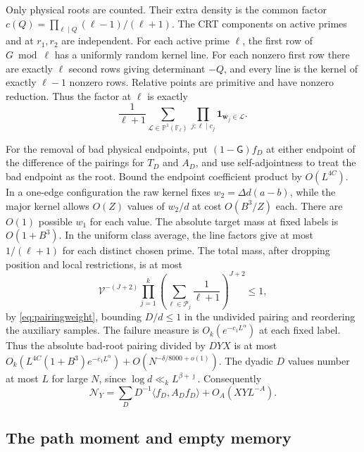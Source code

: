\documentclass[11pt]{amsart}
\numberwithin{equation}{section}
\theoremstyle{remark}
\begin{document}
Only physical roots are counted. Their extra density is the common
factor $c(Q)=\prod_{\ell\mid Q}(\ell-1)/(\ell+1)$. The CRT components
on active primes and at $r_1,r_2$ are independent. For each active
prime $\ell$, the first row of $G\bmod\ell$ has a uniformly random
kernel line. For each nonzero first row there are exactly $\ell$
second rows giving determinant $-Q$, and every line is the kernel of
exactly $\ell-1$ nonzero rows. Relative points are primitive and
have nonzero reduction. Thus the factor at $\ell$ is exactly
\begin{equation}\label{eq:linefactor}
 \frac1{\ell+1}\sum_{\mathcal L\in\mathbb P^1(\mathbb F_\ell)}
   \prod_{j:\ell\mid c_j}\mathbf1_{\overline{\mathbf w_j}\in\mathcal L}.
\end{equation}

For the removal of bad physical endpoints, put $(1-\mathsf G)f_D$
at either endpoint of the difference of the pairings for $T_D$ and
$A_D$, and use self-adjointness to treat the bad endpoint as the
root. Bound the endpoint coefficient product by $O(L^{4C})$. In a
one-edge configuration the raw kernel fixes $w_2=\Delta d(a-b)$,
while the major kernel allows $O(Z)$ values of $w_2/d$ at cost
$O(B^3/Z)$ each. There are $O(1)$ possible $w_1$ for each value.
The absolute target mass at fixed labels is $O(1+B^3)$.
In the uniform class average, the line factors give at most
$1/(\ell+1)$ for each distinct chosen prime. The total mass, after
dropping position and local restrictions, is at most
\[
 \mathcal V^{-(J+2)}\prod_{j=1}^k
  \left(\sum_{\ell\in\mathcal P_j}\frac1{\ell+1}\right)^{J+2}\le 1,
\]
by \eqref{eq:pairingweight}, bounding $D/d\le1$ in the undivided
pairing and reordering the auxiliary samples. The failure measure
is $O_k(e^{-c_1L^\alpha})$ at each fixed label. Thus the absolute
bad-root pairing divided by $DYX$ is at most
$O_k(L^{4C}(1+B^3)e^{-c_1L^\alpha})+O(N^{-\delta/8000+o(1)})$.
The dyadic $D$ values number at most $L$ for large $N$, since
$\log d\ll_k L^{\beta+\jmath}$. Consequently
\begin{equation}\label{eq:goodoperatorpairing}
 \mathcal N_Y=\sum_DD^{-1}\langle f_D,A_Df_D\rangle+O_A(XYL^{-A}).
\end{equation}

\subsection{The path moment and empty memory}
\end{document}
